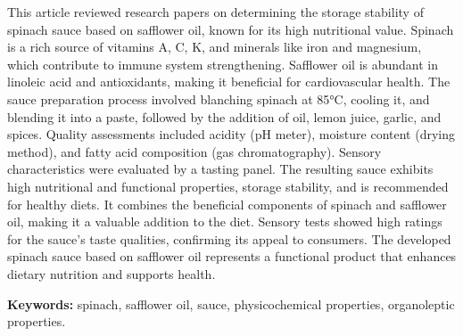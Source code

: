 This article reviewed research papers on determining the storage
stability of spinach sauce based on safflower oil, known for its high
nutritional value. Spinach is a rich source of vitamins A, C, K, and
minerals like iron and magnesium, which contribute to immune system
strengthening. Safflower oil is abundant in linoleic acid and
antioxidants, making it beneficial for cardiovascular health. The sauce
preparation process involved blanching spinach at 85°C, cooling it, and
blending it into a paste, followed by the addition of oil, lemon juice,
garlic, and spices. Quality assessments included acidity (pH meter),
moisture content (drying method), and fatty acid composition (gas
chromatography). Sensory characteristics were evaluated by a tasting
panel. The resulting sauce exhibits high nutritional and functional
properties, storage stability, and is recommended for healthy diets. It
combines the beneficial components of spinach and safflower oil, making
it a valuable addition to the diet. Sensory tests showed high ratings
for the sauce's taste qualities, confirming its appeal to consumers. The
developed spinach sauce based on safflower oil represents a functional
product that enhances dietary nutrition and supports health.

{\bfseries Keywords:} spinach, safflower oil, sauce, physicochemical
properties, organoleptic properties.

